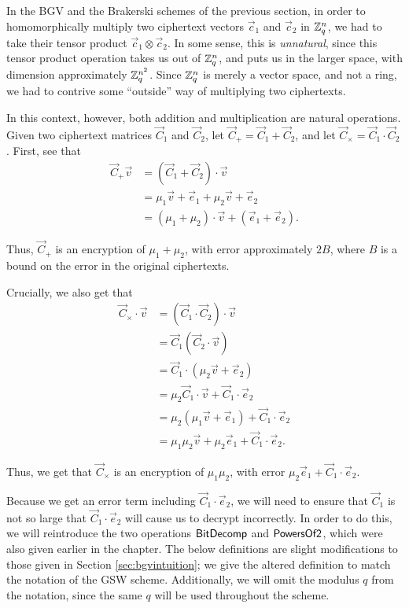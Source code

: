     In the BGV and the Brakerski schemes of the previous section, in order to homomorphically multiply two ciphertext vectors $\vec{c}_1$ and $\vec{c}_2$ in $\mathbb{Z}_q^n$, we had to take their tensor product $\vec{c}_1 \otimes \vec{c}_2$. In some sense, this is \emph{unnatural}, since this tensor product operation takes us out of $\mathbb{Z}_q^n$, and puts us in the larger space, with dimension approximately $\mathbb{Z}_q^{n^2}$. Since $\mathbb{Z}_q^n$ is merely a vector space, and not a ring, we had to contrive some ``outside'' way of multiplying two ciphertexts.

    In this context, however, both addition and multiplication are natural operations. Given two ciphertext matrices $\vec{C}_1$ and $\vec{C}_2$, let $\vec{C}_+ = \vec{C}_1 + \vec{C}_2$, and let $\vec{C}_\times = \vec{C}_1 \cdot \vec{C}_2$. First, see that
    \begin{align*}
        \vec{C}_+ \vec{v} &= (\vec{C}_1 + \vec{C}_2) \cdot \vec{v} \\
        &= \mu_1 \vec{v} + \vec{e}_1 + \mu_2 \vec{v} + \vec{e}_2 \\
        &= (\mu_1 + \mu_2) \cdot \vec{v} + (\vec{e}_1 + \vec{e}_2).
    \end{align*}

    Thus, $\vec{C}_+$ is an encryption of $\mu_1 + \mu_2$, with error approximately $2B$, where $B$ is a bound on the error in the original ciphertexts.

    Crucially, we also get that
    \begin{align*}
        \vec{C}_\times \cdot \vec{v} &= (\vec{C}_1 \cdot \vec{C}_2) \cdot \vec{v} \\
        &= \vec{C}_1 (\vec{C}_2 \cdot \vec{v}) \\
        &= \vec{C}_1 \cdot (\mu_2 \vec{v} + \vec{e}_2) \\
        &= \mu_2 \vec{C}_1 \cdot \vec{v} + \vec{C}_1 \cdot \vec{e}_2 \\
        &= \mu_2 (\mu_1 \vec{v} + \vec{e}_1) + \vec{C}_1 \cdot \vec{e}_2 \\
        &= \mu_1 \mu_2 \vec{v} + \mu_2 \vec{e}_1 + \vec{C}_1 \cdot \vec{e}_2.
    \end{align*}

    Thus, we get that $\vec{C}_\times$ is an encryption of $\mu_1 \mu_2$, with error $\mu_2 \vec{e}_1 + \vec{C}_1 \cdot \vec{e}_2$.

    Because we get an error term including $\vec{C}_1 \cdot \vec{e}_2$, we will need to ensure that $\vec{C}_1$ is not so large that $\vec{C}_1 \cdot \vec{e}_2$ will cause us to decrypt incorrectly. In order to do this, we will reintroduce the two operations ${\sf BitDecomp}$ and ${\sf PowersOf2}$, which were also given earlier in the chapter. The below definitions are slight modifications to those given in Section \ref{sec:bgvintuition}; we give the altered definition to match the notation of the GSW scheme. Additionally, we will omit the modulus $q$ from the notation, since the same $q$ will be used throughout the scheme.

